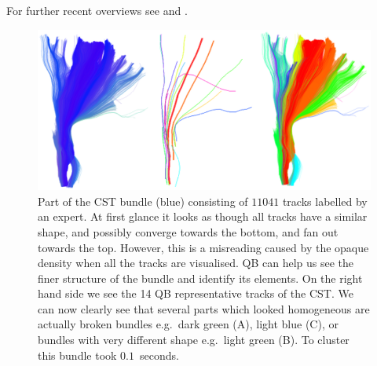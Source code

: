 \documentclass{bioinfo}
\begin{document}
For further recent overviews see \citet{ODonnell_IEEETMI07} and
\citet{wang2010tractography}.

%
\begin{figure}[htp]
\centerline{\includegraphics[width=160mm]{Figures/Fig_4_cst_simplification_relabeled_triple.eps}}
\caption{Part of the CST bundle (blue) consisting of $11041$ tracks
  labelled by an expert. At first glance it looks as though all tracks
  have a similar shape, and possibly converge towards the bottom, and
  fan out towards the top. However, this is a misreading caused by the
  opaque density when all the tracks are visualised.  QB can help us see
  the finer structure of the bundle and identify its elements. On the
  right hand side we see the 14 QB representative tracks of the CST. We
  can now clearly see that several parts which looked homogeneous are
  actually broken bundles e.g.~dark green (A), light blue (C), or
  bundles with very different shape e.g.~light green (B). To cluster
  this bundle took $0.1$~seconds.\label{Flo:cst_pbc}}
\end{figure}
\end{document}
